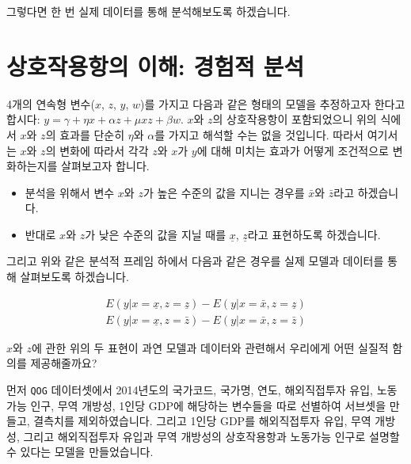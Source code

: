 \documentclass[
]{book}
\begin{document}
그렇다면 한 번 실제 데이터를 통해 분석해보도록 하겠습니다.

\hypertarget{uxc0c1uxd638uxc791uxc6a9uxd56duxc758-uxc774uxd574-uxacbduxd5d8uxc801-uxbd84uxc11d}{%
\section{상호작용항의 이해: 경험적 분석}\label{uxc0c1uxd638uxc791uxc6a9uxd56duxc758-uxc774uxd574-uxacbduxd5d8uxc801-uxbd84uxc11d}}

4개의 연속형 변수(\(x\), \(z\), \(y\), \(w\))를 가지고 다음과 같은 형태의 모델을 추정하고자 한다고 합시다: \(y = \gamma + \eta x + \alpha z + \mu xz + \beta w\). \(x\)와 \(z\)의 상호작용항이 포함되었으니 위의 식에서 \(x\)와 \(z\)의 효과를 단순히 \(\eta\)와 \(\alpha\)를 가지고 해석할 수는 없을 것입니다. 따라서 여기서는 \(x\)와 \(z\)의 변화에 따라서 각각 \(z\)와 \(x\)가 \(y\)에 대해 미치는 효과가 어떻게 조건적으로 변화하는지를 살펴보고자 합니다.

\begin{itemize}
\item
  분석을 위해서 변수 \(x\)와 \(z\)가 높은 수준의 값을 지니는 경우를 \(\bar{x}\)와 \(\bar{z}\)라고 하겠습니다.
\item
  반대로 \(x\)와 \(z\)가 낮은 수준의 값을 지닐 때를 \(\underline{x}\), \(\underline{z}\)라고 표현하도록 하겠습니다.
\end{itemize}

그리고 위와 같은 분석적 프레임 하에서 다음과 같은 경우를 실제 모델과 데이터를 통해 살펴보도록 하겠습니다.

\begin{equation*}
\begin{aligned}
E(y|x = \underline{x}, z = \underline{z}) - E(y|x = \bar{x}, z = \underline{z})\\
E(y|x = \underline{x}, z = \bar{z}) - E(y|x = \bar{x}, z = \bar{z})
\end{aligned}
\end{equation*}

\(x\)와 \(z\)에 관한 위의 두 표현이 과연 모델과 데이터와 관련해서 우리에게 어떤 실질적 함의를 제공해줄까요?

먼저 \texttt{QOG} 데이터셋에서 2014년도의 국가코드, 국가명, 연도, 해외직접투자 유입, 노동가능 인구, 무역 개방성, 1인당 GDP에 해당하는 변수들을 따로 선별하여 서브셋을 만들고, 결측치를 제외하였습니다. 그리고 1인당 GDP를 해외직접투자 유입, 무역 개방성, 그리고 해외직접투자 유입과 무역 개방성의 상호작용항과 노동가능 인구로 설명할 수 있다는 모델을 만들었습니다.
\end{document}
